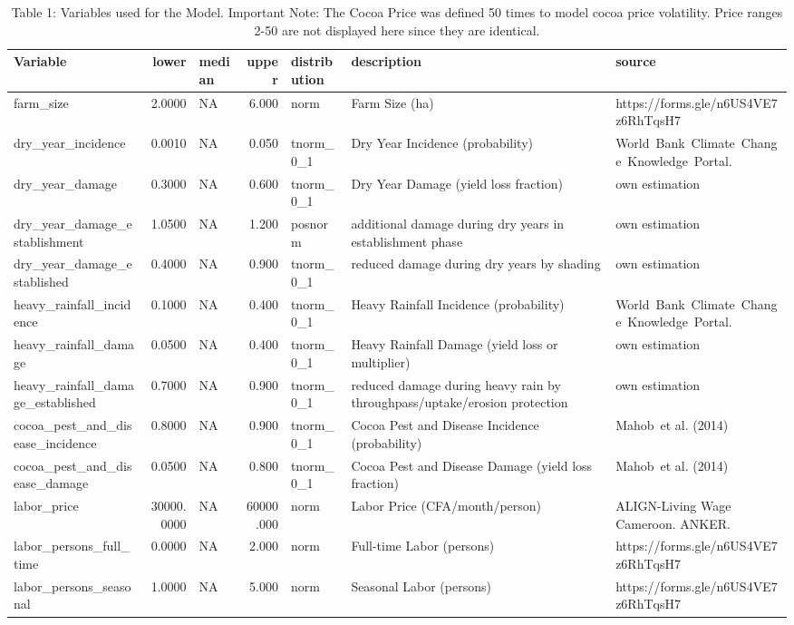 \documentclass[
]{article}
\begin{document}
\begin{longtable}[t]{lrlrlll}
\caption{\label{tab:table}Table 1: Variables used for the Model. Important Note: The Cocoa Price was defined 50 times to model cocoa price volatility. Price ranges 2-50 are not displayed here since they are identical.}\\
\toprule
Variable & lower & median & upper & distribution & description & source\\
\midrule
farm\_size & 2.0000 & NA & 6.000 & norm & Farm Size (ha) & https://forms.gle/n6US4VE7z6RhTqsH7\\
dry\_year\_incidence & 0.0010 & NA & 0.050 & tnorm\_0\_1 & Dry Year Incidence (probability) & World Bank Climate Change Knowledge Portal.\\
dry\_year\_damage & 0.3000 & NA & 0.600 & tnorm\_0\_1 & Dry Year Damage (yield loss fraction) & own estimation\\
dry\_year\_damage\_establishment & 1.0500 & NA & 1.200 & posnorm & additional damage during dry years in establishment phase & own estimation\\
dry\_year\_damage\_established & 0.4000 & NA & 0.900 & tnorm\_0\_1 & reduced damage during dry years by shading & own estimation\\
\addlinespace
heavy\_rainfall\_incidence & 0.1000 & NA & 0.400 & tnorm\_0\_1 & Heavy Rainfall Incidence (probability) & World Bank Climate Change Knowledge Portal.\\
heavy\_rainfall\_damage & 0.0500 & NA & 0.400 & tnorm\_0\_1 & Heavy Rainfall Damage (yield loss or multiplier) & own estimation\\
heavy\_rainfall\_damage\_established & 0.7000 & NA & 0.900 & tnorm\_0\_1 & reduced damage during heavy rain by throughpass/uptake/erosion protection & own estimation\\
cocoa\_pest\_and\_disease\_incidence & 0.8000 & NA & 0.900 & tnorm\_0\_1 & Cocoa Pest and Disease Incidence (probability) & Mahob et al. (2014)\\
cocoa\_pest\_and\_disease\_damage & 0.0500 & NA & 0.800 & tnorm\_0\_1 & Cocoa Pest and Disease Damage (yield loss fraction) & Mahob et al. (2014)\\
\addlinespace
labor\_price & 30000.0000 & NA & 60000.000 & norm & Labor Price (CFA/month/person) & ALIGN-Living Wage Cameroon. ANKER.\\
labor\_persons\_full\_time & 0.0000 & NA & 2.000 & norm & Full-time Labor (persons) & https://forms.gle/n6US4VE7z6RhTqsH7\\
labor\_persons\_seasonal & 1.0000 & NA & 5.000 & norm & Seasonal Labor (persons) & https://forms.gle/n6US4VE7z6RhTqsH7\\

\end{longtable}
\end{document}
